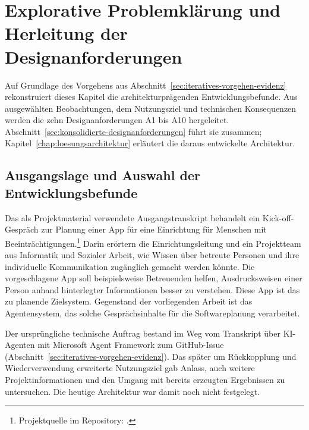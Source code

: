 
\chapter{Explorative Problemklärung und Herleitung der
Designanforderungen}
\label{chap:explorative-problemklaerung}

Auf Grundlage des Vorgehens aus
Abschnitt~\ref{sec:iteratives-vorgehen-evidenz} rekonstruiert dieses
Kapitel die architekturprägenden Entwicklungsbefunde. Aus ausgewählten
Beobachtungen, dem Nutzungsziel und technischen Konsequenzen werden
die zehn Designanforderungen A1 bis A10 hergeleitet.
Abschnitt~\ref{sec:konsolidierte-designanforderungen} führt sie
zusammen; Kapitel~\ref{chap:loesungsarchitektur} erläutert die daraus
entwickelte Architektur.

\section{Ausgangslage und Auswahl der Entwicklungsbefunde}
\label{sec:ausgangslage-entwicklungsbefunde}

Das als Projektmaterial verwendete Ausgangstranskript behandelt ein
Kick-off-Gespräch zur Planung einer App für eine Einrichtung für
Menschen mit Beeinträchtigungen.\footnote{Projektquelle im Repository:
.}
Darin erörtern die Einrichtungsleitung
und ein Projektteam aus Informatik und Sozialer Arbeit, wie Wissen
über betreute Personen und ihre individuelle Kommunikation zugänglich
gemacht werden könnte. Die vorgeschlagene App soll beispielsweise
Betreuenden helfen, Ausdrucksweisen einer Person anhand hinterlegter
Informationen besser zu verstehen. Diese App ist das zu planende
Zielsystem. Gegenstand der vorliegenden Arbeit ist das Agentensystem,
das solche Gesprächsinhalte für die Softwareplanung verarbeitet.

Der ursprüngliche technische Auftrag bestand im Weg vom Transkript
über KI-Agenten mit Microsoft Agent Framework zum GitHub-Issue
(Abschnitt~\ref{sec:iteratives-vorgehen-evidenz}). Das später um
Rückkopplung und Wiederverwendung erweiterte Nutzungsziel gab Anlass,
auch weitere Projektinformationen und den Umgang mit bereits
erzeugten Ergebnissen zu untersuchen. Die heutige Architektur war
damit noch nicht festgelegt.

